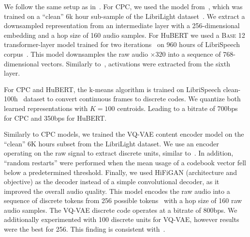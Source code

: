 {} 
\label{sec:impl}
We follow the same setup as in~\cite{lakhotia2021generative}. For CPC, we used the model from~\cite{Riviere2020}, which was trained on a ``clean'' 6k hour sub-sample of the LibriLight dataset~\cite{Kahn2020,Riviere2020}. We extract a downsampled representation from an intermediate layer with a 256-dimensional embedding and a hop size of 160 audio samples. For HuBERT we used a \textsc{Base} 12 transformer-layer model trained for two iterations~\cite{hsu2020hubert} on 960 hours of LibriSpeech corpus~\cite{Panayotov2015}. 
This model downsamples the raw audio $\times320$ into a sequence of 768-dimensional vectors. Similarly to~\cite{lakhotia2021generative}, activations were extracted from the sixth layer.

For CPC and HuBERT, the k-means algorithm is trained on LibriSpeech clean-100h~\cite{Panayotov2015} dataset to convert continuous frames to discrete codes. We quantize both learned representations with $K=100$ centroids. Leading to a bitrate of 700bps for CPC and 350bps for HuBERT.

Similarly to CPC models, we trained the VQ-VAE content encoder model on the ``clean'' 6K hours subset from the LibriLight dataset. We use an encoder operating on the raw signal to extract discrete units, similar to~\cite{jukebox}. In addition, ``random restarts'' were performed when the mean usage of a codebook vector fell below a predetermined threshold. Finally, we used HiFiGAN (architecture and objective) as the decoder instead of a simple convolutional decoder, as it improved the overall audio quality. This model encodes the raw audio into a sequence of discrete tokens from 256 possible tokens~\cite{garbacea2019low} with a hop size of 160 raw audio samples. The VQ-VAE discrete code operates at a bitrate of 800bps. We additionally experimented with 100 discrete units for VQ-VAE, however results were the best for 256. This finding is consistent with~\cite{garbacea2019low}.

